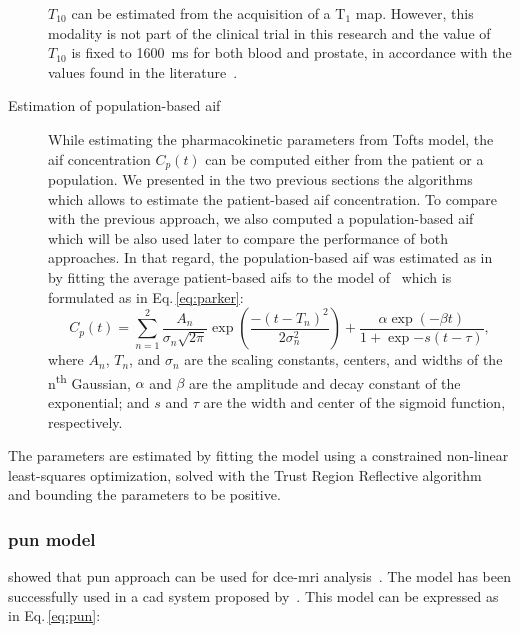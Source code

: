 \begin{description}
      $T_{10}$ can be estimated from the acquisition of a T$_1$ map.
      However, this modality is not part of the clinical trial in this research and the value of $T_{10}$ is fixed to \SI{1600}{\ms} for both blood and prostate, in accordance with the values found in the literature~\citep{fennessy2015quantitative,de2004mr,carr2011magnetic}.
      \item[Estimation of population-based \ac{aif}] While estimating the pharmacokinetic parameters from Tofts model, the \ac{aif} concentration $C_p(t)$ can be computed either from the patient or a population.
        We presented in the two previous sections the algorithms which allows to estimate the patient-based \ac{aif} concentration.
        To compare with the previous approach, we also computed a population-based \ac{aif} which will be also used later to compare the performance of both approaches.
        In that regard, the population-based \ac{aif} was estimated as in~\citep{meng2010comparison} by fitting the average patient-based \ac{aif}s to the model of~\cite{parker2006experimentally} which is formulated as in Eq.\,\eqref{eq:parker}:
        \begin{equation}
          C_p(t) = \sum_{n=1}^{2} \frac{A_n}{\sigma_n \sqrt{2 \pi}} \exp\left(\frac{- (t- T_n)^2}{2\sigma_{n}^{2}}\right) + \frac{\alpha \exp(-\beta t)}{1 + \exp{-s (t - \tau)}} ,
          \label{eq:parker}
        \end{equation}
        \noindent where $A_n$, $T_n$, and $\sigma_n$ are the scaling constants, centers, and widths of the n\textsuperscript{th} Gaussian, $\alpha$ and $\beta$ are the amplitude and decay constant of the exponential; and $s$ and $\tau$ are the width and center of the sigmoid function, respectively.
\end{description}

The parameters are estimated by fitting the model using a constrained non-linear least-squares optimization, solved with the Trust Region Reflective algorithm~\citep{sorensen1982newton} and bounding the parameters to be positive.

\subsubsection{\acs*{pun} model}\label{sec:pun}

\citeauthor{gliozzi2011phenomenological} showed that \ac{pun} approach can be used for \ac{dce}-\ac{mri} analysis~\citep{gliozzi2011phenomenological}.
The model has been successfully used in a \ac{cad} system proposed by~\cite{giannini2015fully}.
This model can be expressed as in Eq.\,\eqref{eq:pun}:

